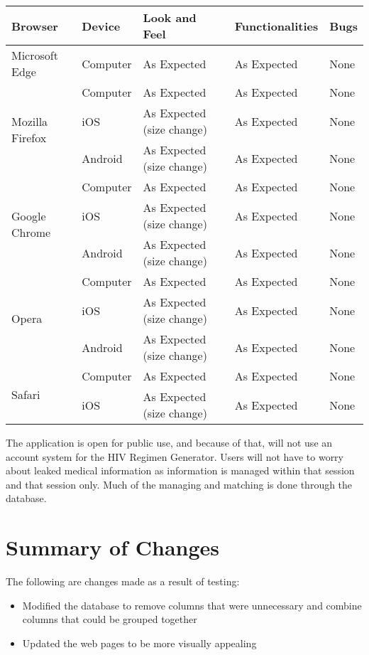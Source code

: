 \documentclass[12pt]{article}
\begin{document}
\begin{center}
    \begin{tabular}{ | l | p{3cm} | p{3cm} | p{3cm} | p{1.5cm} |}
    \hline
    \textbf{Browser} & \textbf{Device} & \textbf{Look and Feel} & \textbf{Functionalities} & \textbf{Bugs} \\ \hline
 Microsoft Edge & Computer & As Expected & As Expected & None \\ \hline

\multirow{3}{*}{Mozilla Firefox}
 & Computer & As Expected & As Expected & None \\
 & iOS & As Expected (size change) & As Expected & None \\
 & Android & As Expected (size change) & As Expected & None \\ \hline

\multirow{3}{*}{Google Chrome}
 & Computer & As Expected & As Expected & None \\
 & iOS & As Expected (size change) & As Expected & None \\
 & Android & As Expected (size change) & As Expected & None \\ \hline

\multirow{3}{*}{Opera}
 & Computer & As Expected & As Expected & None \\
 & iOS & As Expected (size change) & As Expected & None \\
 & Android & As Expected (size change) & As Expected & None \\ \hline

\multirow{2}{*}{Safari}
 & Computer & As Expected & As Expected & None \\
 & iOS & As Expected (size change) & As Expected & None \\ \hline

    \end{tabular}
\end{center}

The application is open for public use, and because of that, will not use an account system for the HIV Regimen Generator. Users will not have to worry about leaked medical information as information is managed within that session and that session only. Much of the managing and matching is done through the database.

\section{Summary of Changes}
The following are changes made as a result of testing:
\begin{itemize}
\item Modified the database to remove columns that were unnecessary and combine columns that could be grouped together
\item Updated the web pages to be more visually appealing
\end{itemize}
\end{document}
